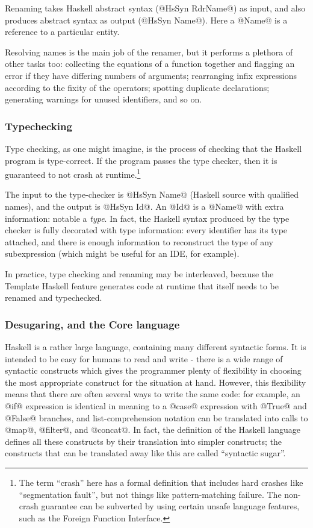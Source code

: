 \documentclass{article}
\begin{document}
Renaming takes Haskell abstract syntax (@HsSyn RdrName@) as input, and
also produces abstract syntax as output (@HsSyn Name@).  Here a @Name@
is a reference to a particular entity.


Resolving names is the main job of the renamer, but it performs a
plethora of other tasks too: collecting the equations of a function
together and flagging an error if they have differing numbers of
arguments; rearranging infix expressions according to the fixity of
the operators; spotting duplicate declarations; generating warnings
for unused identifiers, and so on.

\subsubsection{Typechecking}

Type checking, as one might imagine, is the process of checking that
the Haskell program is type-correct.  If the program passes the type
checker, then it is guaranteed to not crash at runtime.\footnote{The
  term ``crash'' here has a formal definition that includes hard
  crashes like ``segmentation fault'', but not things like
  pattern-matching failure.  The non-crash guarantee can be subverted
  by using certain unsafe language features, such as the Foreign
  Function Interface.}

The input to the type-checker is @HsSyn Name@ (Haskell source with
qualified names), and the output is @HsSyn Id@.  An @Id@ is a @Name@
with extra information: notable a \emph{type}.  In fact, the Haskell
syntax produced by the type checker is fully decorated with type
information: every identifier has its type attached, and there is
enough information to reconstruct the type of any subexpression
(which might be useful for an IDE, for example).

In practice, type checking and renaming may be interleaved, because
the Template Haskell feature generates code at runtime that itself
needs to be renamed and typechecked.

\subsubsection{Desugaring, and the Core language}

Haskell is a rather large language, containing many different
syntactic forms.  It is intended to be easy for humans to read and
write - there is a wide range of syntactic constructs which gives the
programmer plenty of flexibility in choosing the most appropriate
construct for the situation at hand.  However, this flexibility means
that there are often several ways to write the same code: for example,
an @if@ expression is identical in meaning to a @case@ expression with
@True@ and @False@ branches, and list-comprehension notation can be
translated into calls to @map@, @filter@, and @concat@.  In fact, the
definition of the Haskell language defines all these constructs by
their translation into simpler constructs; the constructs that can be
translated away like this are called ``syntactic sugar''.
\end{document}

